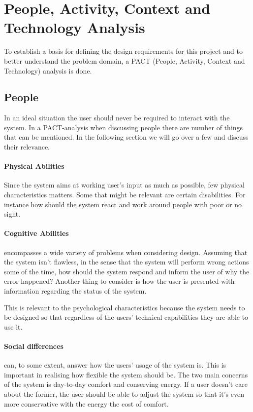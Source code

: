 \section{People, Activity, Context and Technology Analysis}
To establish a basis for defining the design requirements for this project and
to better understand the problem domain, a PACT (People, Activity, Context and Technology) analysis is done.

\subsection{People}
In an ideal situation the user should never be required to interact with the system. In a PACT-analysis when discussing people there are number of things that can be mentioned. In the following section we will go over a few and discuss their relevance.

\paragraph{Physical Abilities}
Since the system aims at working user's input as much as possible, few physical characteristics matters. Some that might be relevant are certain disabilities. For instance how should the system react and work around people with poor or no sight.

\paragraph{Cognitive Abilities} encompasses a wide variety of problems
when considering design. Assuming that the system isn't flawless, in the
  sense that the system will perform wrong actions some of the time, how should
the system respond and inform the user of why the error happened? Another thing
to consider is how the user is presented with information regarding the status
of the system.

This is relevant to the psychological characteristics because the system needs to be designed so that regardless of the users' technical capabilities they are able to use it.

\paragraph{Social differences} can, to some extent, answer how the users' usage of
the system is. This is important in realising how flexible the system should be.
The two main concerns of the system is day-to-day comfort and conserving energy.
If a user doesn't care about the former, the user should be able to adjust the system so that it's even more conservative with the energy the cost of comfort.

